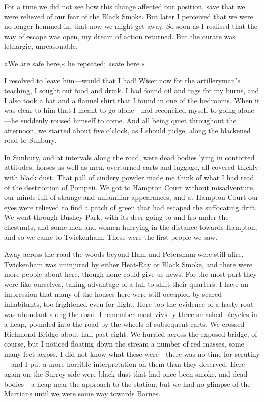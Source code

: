 For a time we did not see how this change affected our position, save that we were relieved of our fear of the Black Smoke. But later I perceived that we were no longer hemmed in, that now we might get away. So soon as I realised that the way of escape was open, my dream of action returned. But the curate was lethargic, unreasonable.

»We are safe here,« he repeated; »safe here.«

I resolved to leave him—would that I had! Wiser now for the artilleryman's teaching, I sought out food and drink. I had found oil and rags for my burns, and I also took a hat and a flannel shirt that I found in one of the bedrooms. When it was clear to him that I meant to go alone—had reconciled myself to going alone—he suddenly roused himself to come. And all being quiet throughout the afternoon, we started about five o'clock, as I should judge, along the blackened road to Sunbury.

In Sunbury, and at intervals along the road, were dead bodies lying in contorted attitudes, horses as well as men, overturned carts and luggage, all covered thickly with black dust. That pall of cindery powder made me think of what I had read of the destruction of Pompeii. We got to Hampton Court without misadventure, our minds full of strange and unfamiliar appearances, and at Hampton Court our eyes were relieved to find a patch of green that had escaped the suffocating drift. We went through Bushey Park, with its deer going to and fro under the chestnuts, and some men and women hurrying in the distance towards Hampton, and so we came to Twickenham. These were the first people we saw.

Away across the road the woods beyond Ham and Petersham were still afire. Twickenham was uninjured by either Heat-Ray or Black Smoke, and there were more people about here, though none could give us news. For the most part they were like ourselves, taking advantage of a lull to shift their quarters. I have an impression that many of the houses here were still occupied by scared inhabitants, too frightened even for flight. Here too the evidence of a hasty rout was abundant along the road. I remember most vividly three smashed bicycles in a heap, pounded into the road by the wheels of subsequent carts. We crossed Richmond Bridge about half past eight. We hurried across the exposed bridge, of course, but I noticed floating down the stream a number of red masses, some many feet across. I did not know what these were—there was no time for scrutiny—and I put a more horrible interpretation on them than they deserved. Here again on the Surrey side were black dust that had once been smoke, and dead bodies—a heap near the approach to the station; but we had no glimpse of the Martians until we were some way towards Barnes.


